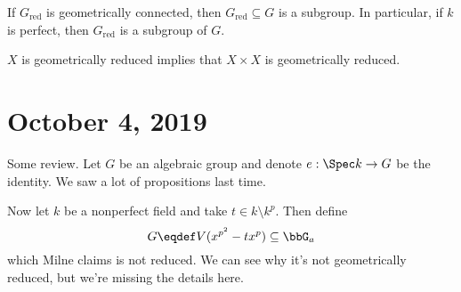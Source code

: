 \documentclass[12pt]{article}
\begin{document}
\begin{prop}
	If $G_{\text{red}}$ is geometrically connected, then $G_{\text{red}}\subseteq G$ is a subgroup. In particular, 
	if $k$ is perfect, then $G_{\text{red}}$ is a subgroup of $G$.
\end{prop}
\begin{rmk}
	$X$ is geometrically reduced implies that $X\times X$ is geometrically reduced.
\end{rmk}

\section{October 4, 2019}
Some review. Let $G$ be an algebraic group and denote $e:\Spec k\to G$ be the identity. We saw a lot of propositions last time.

Now let $k$ be a nonperfect field and take $t\in k\setminus k^p$. Then define 
\[G\eqdef V(x^{p^2}-tx^p)\subseteq \bbG_a\]
which Milne claims is not reduced. We can see why it's not geometrically reduced, but we're missing the details here.
\end{document}

